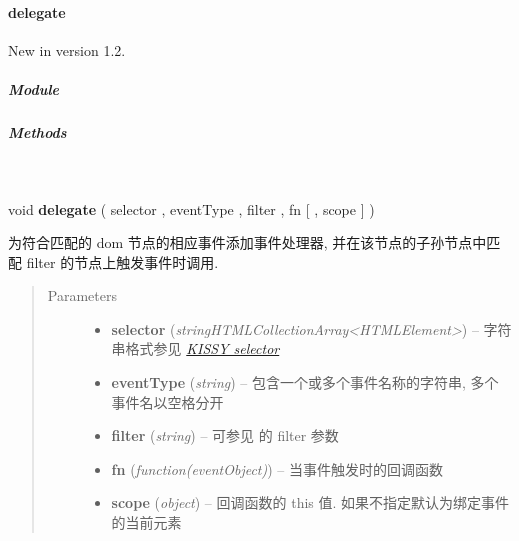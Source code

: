 \documentclass[letterpaper,10pt,english]{sphinxmanual}
\begin{document}
\paragraph{delegate}
\label{api/core/event/delegate::doc}\label{api/core/event/delegate:delegate}New in version 1.2.

\subparagraph{Module}
\label{api/core/event/delegate:module}\begin{quote}

{\hyperref[api/core/event/index:module-Event]{}}
\end{quote}


\subparagraph{Methods}
\label{api/core/event/delegate:methods}

\begin{fulllineitems}
\label{api/core/event/delegate:Event.delegate}~
\begin{DUlineblock}{0em}
\item[] void \textbf{delegate} ( selector , eventType , filter , fn {[} , scope {]} )
\item[] 为符合匹配的 dom 节点的相应事件添加事件处理器, 并在该节点的子孙节点中匹配 filter 的节点上触发事件时调用.
\end{DUlineblock}
\begin{quote}\begin{description}
\item[{Parameters}] \leavevmode\begin{itemize}
\item {}
\textbf{selector} (\emph{string\textbar{}HTMLCollection\textbar{}Array\textless{}HTMLElement\textgreater{}}) -- 字符串格式参见 {\hyperref[api/core/dom/selector:dom-selector]{\emph{KISSY selector}}}

\item {}
\textbf{eventType} (\emph{string}) -- 包含一个或多个事件名称的字符串, 多个事件名以空格分开

\item {}
\textbf{filter} (\emph{string}) -- 可参见 {\hyperref[api/core/dom/filter:DOM.filter]{}} 的 filter 参数

\item {}
\textbf{fn} (\emph{function(eventObject)}) -- 当事件触发时的回调函数

\item {}
\textbf{scope} (\emph{object}) -- 回调函数的 this 值. 如果不指定默认为绑定事件的当前元素


\end{itemize}
\end{description}
\end{quote}
\end{fulllineitems}
\end{document}
